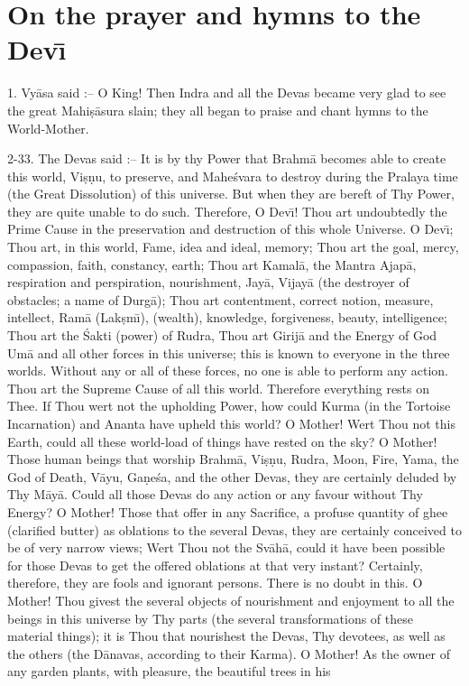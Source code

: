 \chapter{On the prayer and hymns to the Dev\={\i}}

1. Vy\=asa said :-- O King! Then Indra and all the Devas became very glad to see the great Mahi\d{s}\=asura slain; they all began to praise and chant hymns to the World-Mother.

2-33. The Devas said :-- It is by thy Power that Brahm\=a becomes able to create this world, Vi\d{s}\d{n}u, to preserve, and Mahe\'svara to destroy during the Pralaya time (the Great Dissolution) of this universe. But when they are bereft of Thy Power, they are quite unable to do such. Therefore, O Dev\={\i}! Thou art undoubtedly the Prime Cause in the preservation and destruction of this whole Universe. O Dev\={\i}; Thou art, in this world, Fame, idea and ideal, memory; Thou art the goal, mercy, compassion, faith, constancy, earth; Thou art Kamal\=a, the Mantra Ajap\=a, respiration and perspiration, nourishment, Jay\=a, Vijay\=a (the destroyer of obstacles; a name of Durg\=a); Thou art contentment, correct notion, measure, intellect, Ram\=a (Lak\d{s}m\={\i}), (wealth), knowledge, forgiveness, beauty, intelligence; Thou art the \'Sakti (power) of Rudra, Thou art Girij\=a and the Energy of God Um\=a and all other forces in this universe; this is known to everyone in the three worlds. Without any or all of these forces, no one is able to perform any action. Thou art the Supreme Cause of all this world. Therefore everything rests on Thee. If Thou wert not the upholding Power, how could Kurma (in the Tortoise Incarnation) and Ananta have upheld this world? O Mother! Wert Thou not this Earth, could all these world-load of things have rested on the sky? O Mother! Those human beings that worship Brahm\=a, Vi\d{s}\d{n}u, Rudra, Moon, Fire, Yama, the God of Death, V\=ayu, Ga\d{n}e\'sa, and the other Devas, they are certainly deluded by Thy M\=ay\=a. Could all those Devas do any action or any favour without Thy Energy? O Mother! Those that offer in any Sacrifice, a profuse quantity of ghee (clarified butter) as oblations to the several Devas, they are certainly conceived to be of very narrow views; Wert Thou not the Sv\=ah\=a, could it have been possible for those Devas to get the offered oblations at that very instant? Certainly, therefore, they are fools and ignorant persons. There is no doubt in this. O Mother! Thou givest the several objects of nourishment and enjoyment to all the beings in this universe by Thy parts (the several transformations of these material things); it is Thou that nourishest the Devas, Thy devotees, as well as the others (the D\=anavas, according to their Karma). O Mother! As the owner of any garden plants, with pleasure, the beautiful trees in his

